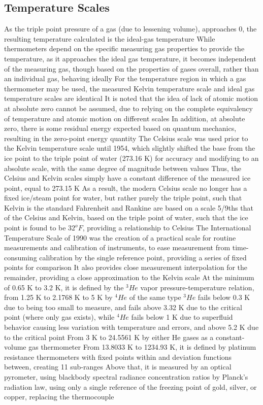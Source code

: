 \documentclass[11 pt, twoside]{article}
\newenvironment{outline*}
{
	\begin{outline}[enumerate]
	}
	{\end{outline}
}
\begin{document}
\subsection{Temperature Scales}
\begin{outline*}
\1 As the triple point pressure of a gas (due to lessening volume), approaches 0, the resulting temperature calculated is the ideal-gas temperature
\2 While thermometers depend on the specific measuring gas properties to provide the temperature, as it approaches the ideal gas temperature, it becomes independent of the measuring gas, though based on the properties of gases overall, rather than an individual gas, behaving ideally
\2 For the temperature region in which a gas thermometer may be used, the measured Kelvin temperature scale and ideal gas temperature scales are identical
\2 It is noted that the idea of lack of atomic motion at absolute zero cannot be assumed, due to relying on the complete equivalency of temperature and atomic motion on different scales 
\3 In addition, at absolute zero, there is some residual energy expected based on quantum mechanics, resulting in the zero-point energy quantity
\1 The Celsius scale was used prior to the Kelvin temperature scale until 1954, which slightly shifted the base from the ice point to the triple point of water (273.16 K) for accuracy and modifying to an absolute scale, with the same degree of magnitude between values
\2 Thus, the Celsius and Kelvin scales simply have a constant difference of the measured ice point, equal to 273.15 K
\2 As a result, the modern Celsius scale no longer has a fixed ice/steam point for water, but rather purely the triple point, such that Kelvin is the standard
\1 Fahrenheit and Rankine are based on a scale 5/9ths that of the Celsius and Kelvin, based on the triple point of water, such that the ice point is found to be $32^o F$, providing a relationship to Celsius
\1 The International Temperature Scale of 1990 was the creation of a practical scale for routine measurements and calibration of instruments, to ease measurement from time-consuming calibration by the single reference point,  providing a series of fixed points for comparison
\2 It also provides close measurement interpolation for the remainder, providing a close approximation to the Kelvin scale
\2 At the minimum of 0.65 K to 3.2 K, it is defined by the $^3He$ vapor pressure-temperature relation, from 1.25 K to 2.1768 K to 5 K by $^4He$ of the same type
\3 $^3He$ fails below 0.3 K due to being too small to measure, and fails above 3.32 K due to the critical point (where only gas exists), while $^4He$ fails below 1 K due to superfluid behavior causing less variation with temperature and errors, and above 5.2 K due to the critical point
\2 From 3 K to 24.5561 K by either He gases as a constant-volume gas thermometer
\2 From 13.8033 K to 1234.93 K, it is defined by platinum resistance thermometers with fixed points within and deviation functions between, creating 11 sub-ranges
\2 Above that, it is measured by an optical pyrometer, using blackbody spectral radiance concentration ratios by Planck's radiation law, using only a single reference of the freezing point of gold, silver, or copper, replacing the thermocouple
\end{outline*}
\end{document}
